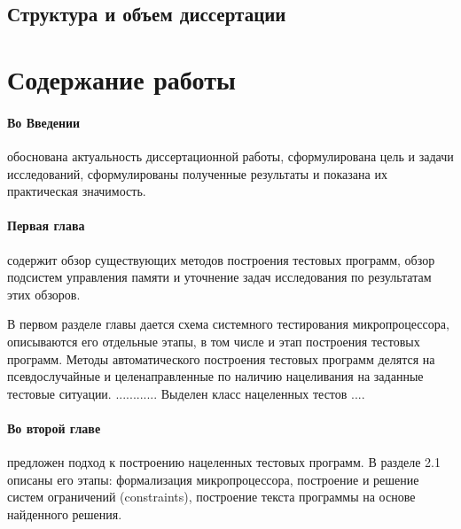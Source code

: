\documentclass[14pt,autoref,href
,facsimile
]{disser}
\begin{document}
\subsection*{Структура и объем диссертации}
\Structure


%
%


\section*{Содержание работы}

\paragraph{Во Введении} обоснована актуальность диссертационной работы,
сформулирована цель и задачи исследований, сформулированы полученные результаты и показана их
практическая значимость.

%
%


\paragraph{Первая глава} содержит обзор существующих методов построения тестовых программ, обзор подсистем управления памяти и уточнение задач исследования по результатам этих обзоров.

В первом разделе главы дается схема системного тестирования микропроцессора, описываются его отдельные этапы, в том числе и этап построения тестовых программ. Методы автоматического построения тестовых программ делятся на псевдослучайные и целенаправленные по наличию нацеливания на заданные тестовые ситуации. ............ Выделен класс нацеленных тестов ....

\paragraph{Во второй главе} предложен подход к построению нацеленных тестовых программ. В разделе 2.1 описаны его этапы: формализация микропроцессора, построение и решение систем ограничений (constraints), построение текста программы на основе найденного решения.
\end{document}
